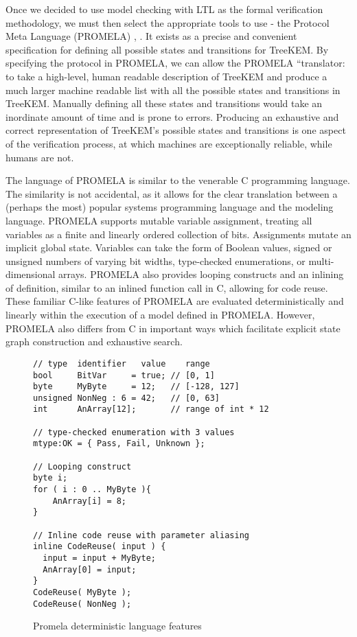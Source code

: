 Once we decided to use model checking with LTL as the formal verification methodology, we must then select the appropriate tools to use - the Protocol Meta Language (PROMELA) \autocite{holzmann1980basic}, \autocite{holzmann1990design}.
It exists as a precise and convenient specification for defining all possible states and transitions for TreeKEM.
By specifying the protocol in PROMELA, we can allow the PROMELA ``translator: to take a high-level, human readable description of TreeKEM and produce a much larger machine readable list with all the possible states and transitions in TreeKEM.
Manually defining all these states and transitions would take an inordinate amount of time and is prone to errors.
Producing an exhaustive and correct representation of TreeKEM's possible states and transitions is one aspect of the verification process, at which machines are exceptionally reliable, while humans are not.

The language of PROMELA is similar to the venerable C programming language.
The similarity is not accidental, as it allows for the clear translation between a (perhaps the most) popular systems programming language and the modeling language.
PROMELA supports mutable variable assignment, treating all variables as a finite and linearly ordered collection of bits.
Assignments mutate an implicit global state.
Variables can take the form of Boolean values, signed or unsigned numbers of varying bit widths, type-checked enumerations, or multi-dimensional arrays.
PROMELA also provides looping constructs and an inlining of definition, similar to an inlined function call in C, allowing for code reuse.
These familiar C-like features of PROMELA are evaluated deterministically and linearly within the execution of a model defined in PROMELA.
However, PROMELA also differs from C in important ways which facilitate explicit state graph construction and exhaustive search.

\begin{figure}
\centering
\caption{Promela deterministic language features}
\begin{verbatim}
// type  identifier   value    range
bool     BitVar     = true; // [0, 1]
byte     MyByte     = 12;   // [-128, 127]
unsigned NonNeg : 6 = 42;   // [0, 63]
int      AnArray[12];       // range of int * 12

// type-checked enumeration with 3 values
mtype:OK = { Pass, Fail, Unknown };

// Looping construct
byte i;
for ( i : 0 .. MyByte ){
    AnArray[i] = 8;
}

// Inline code reuse with parameter aliasing
inline CodeReuse( input ) {
  input = input + MyByte;
  AnArray[0] = input;
}
CodeReuse( MyByte );
CodeReuse( NonNeg );
\end{verbatim}
\end{figure}

